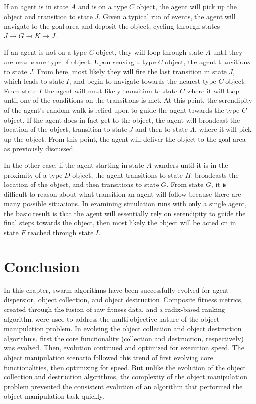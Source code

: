 If an agent is in state $A$ and is on a type $C$ object, the agent will pick up the object and transition to state $J$.  Given a typical run of events, the agent will navigate to the goal area and deposit the object, cycling through states $J \rightarrow G \rightarrow K \rightarrow J$.  

If an agent is not on a type $C$ object, they will loop through state $A$ until they are near some type of object.  Upon sensing a type $C$ object, the agent transitions to state $J$.  From here, most likely they will fire the last transition in state $J$, which leads to state $I$, and begin to navigate towards the nearest type $C$ object.  From state $I$ the agent will most likely transition to state $C$ where it will loop until one of the conditions on the transitions is met.  At this point, the serendipity of the agent's random walk is relied upon to guide the agent towards the type $C$ object.  If the agent does in fact get to the object, the agent will broadcast the location of the object, transition to state $J$ and then to state $A$, where it will pick up the object.  From this point, the agent will deliver the object to the goal area as previously discussed.

In the other case, if the agent starting in state $A$ wanders until it is in the proximity of a type $D$ object, the agent transitions to state $H$, broadcasts the location of the object, and then transitions to state $G$.  From state $G$, it is difficult to reason about what transition an agent will follow because there are many possible situations.  In examining simulation runs with only a single agent, the basic result is that the agent will essentially rely on serendipity to guide the final steps towards the object, then most likely the object will be acted on in state $F$ reached through state $I$.

\section{Conclusion}

In this chapter, swarm algorithms have been successfully evolved for agent dispersion, object collection, and object destruction.  Composite fitness metrics, created through the fusion of raw fitness data, and a radix-based ranking algorithm were used to address the multi-objective nature of the object manipulation problem.  In evolving the object collection and object destruction algorithms, first the core functionality (collection and destruction, respectively) was evolved.  Then, evolution continued and optimized for execution speed.  The object manipulation scenario followed this trend of first evolving core functionalities, then optimizing for speed.  But unlike the evolution of the object collection and destruction algorithms, the complexity of the object manipulation problem prevented the consistent evolution of an algorithm that performed the object manipulation task quickly.

